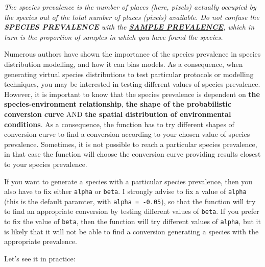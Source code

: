 \documentclass[]{article}
\newenvironment{Shaded}{\begin{snugshade}}{\end{snugshade}}
\newcommand{\KeywordTok}[1]{\textcolor[rgb]{0.13,0.29,0.53}{\textbf{#1}}}
\newcommand{\DataTypeTok}[1]{\textcolor[rgb]{0.13,0.29,0.53}{#1}}
\newcommand{\FloatTok}[1]{\textcolor[rgb]{0.00,0.00,0.81}{#1}}
\newcommand{\StringTok}[1]{\textcolor[rgb]{0.31,0.60,0.02}{#1}}
\newcommand{\CommentTok}[1]{\textcolor[rgb]{0.56,0.35,0.01}{\textit{#1}}}
\newcommand{\NormalTok}[1]{#1}
\begin{document}
\emph{The species prevalence is the number of places (here, pixels)
actually occupied by the species out of the total number of places
(pixels) available. Do not confuse the \textbf{SPECIES PREVALENCE} with
the \protect\hyperlink{defining-the-sample-prevalence}{\textbf{SAMPLE
PREVALENCE}}, which in turn is the proportion of samples in which you
have found the species.}

Numerous authors have shown the importance of the species prevalence in
species distribution modelling, and how it can bias models. As a
consequence, when generating virtual species distributions to test
particular protocols or modelling techniques, you may be interested in
testing different values of species prevalence. However, it is important
to know that the species prevalence is dependent on \textbf{the
species-environment relationship}, \textbf{the shape of the
probabilistic conversion curve} AND \textbf{the spatial distribution of
environmental conditions}. As a consequence, the function has to try
different shapes of conversion curve to find a conversion according to
your chosen value of species prevalence. Sometimes, it is not possible
to reach a particular species prevalence, in that case the function will
choose the conversion curve providing results closest to your species
prevalence.

If you want to generate a species with a particular species prevalence,
then you also have to fix either \texttt{alpha} or \texttt{beta}. I
strongly advise to fix a value of \texttt{alpha} (this is the default
paramter, with \texttt{alpha\ =\ -0.05}), so that the function will try
to find an appropriate conversion by testing different values of
\texttt{beta}. If you prefer to fix the value of \texttt{beta}, then the
function will try different values of \texttt{alpha}, but it is likely
that it will not be able to find a conversion generating a species with
the appropriate prevalence.

Let's see it in practice:

\begin{Shaded}
\end{Shaded}
\end{document}
